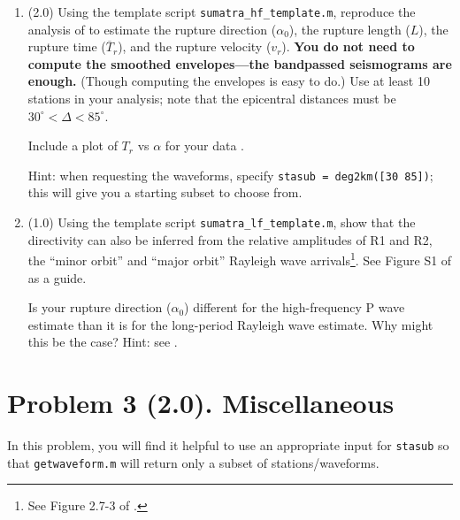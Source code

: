 \documentclass[11pt,titlepage,fleqn]{article}
\begin{document}
\begin{enumerate}
\item (2.0) Using the template script \verb+sumatra_hf_template.m+, reproduce the analysis of \citet{Ni2005} to estimate the rupture direction ($\alpha_0$), the rupture length ($L$), the rupture time ($\overline{T}_r$), and the rupture velocity ($v_r$). {\bf You do not need to compute the smoothed envelopes---the bandpassed seismograms are enough.} (Though computing the envelopes is easy to do.) Use at least 10 stations in your analysis; note that the epicentral distances must be $30^\circ < \Delta < 85^\circ$.

Include a plot of $T_r$ vs $\alpha$ for your data \citep[see Figure~S1 of][]{Ni2005}.

Hint: when requesting the waveforms, specify \verb+stasub = deg2km([30 85])+; this will give you a starting subset to choose from.

\item (1.0) Using the template script \verb+sumatra_lf_template.m+, show that the directivity can also be inferred from the relative amplitudes of R1 and R2, the ``minor orbit'' and ``major orbit'' Rayleigh wave arrivals\footnote{See Figure 2.7-3 of \citet{SteinWysession}.}. See Figure S1 of \citet{Ammon2005} as a guide.

Is your rupture direction ($\alpha_0$) different for the high-frequency P wave estimate than it is for the long-period Rayleigh wave estimate. Why might this be the case? Hint: see .
\end{enumerate}


\section*{Problem 3 (2.0). Miscellaneous}

In this problem, you will find it helpful to use an appropriate input for \verb+stasub+ so that \verb+getwaveform.m+ will return only a subset of stations/waveforms.
\end{document}
